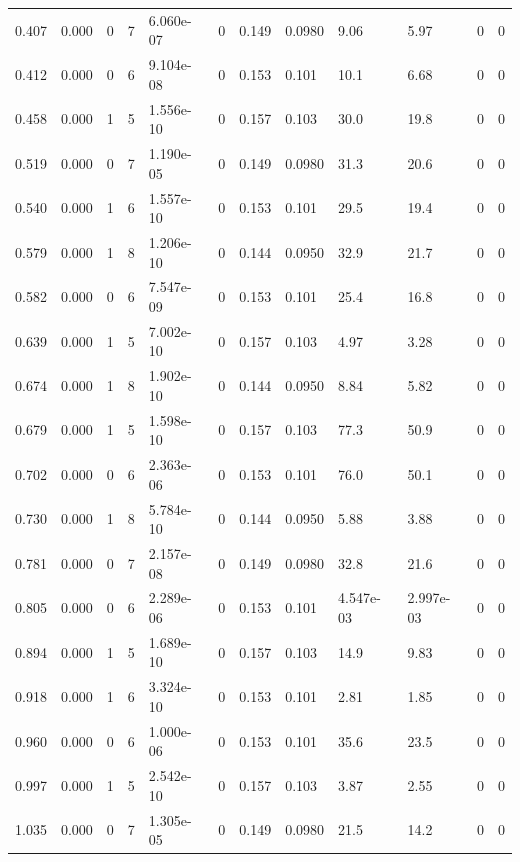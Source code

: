\documentclass[preview]{standalone}
\begin{document}
{{\begin{tabular}{L{1.2cm}C{1.2cm} C{0.3cm}C{0.5cm} C{1.4cm}C{1.4cm} C{1.4cm}C{1.4cm} C{1.6cm}C{1.6cm} C{1.6cm}C{1.6cm}}
  0.407  &  0.000  & 0     &  7 &  6.060e-07  & 0  &  0.149&   0.0980& 9.06 & 5.97   &  0 & 0  \\ 
  0.412  &  0.000  & 0     &  6 &  9.104e-08  & 0  &  0.153&   0.101& 10.1 & 6.68   &  0 & 0  \\ 
  0.458  &  0.000  & 1     &  5 &  1.556e-10  & 0  &  0.157&   0.103& 30.0 & 19.8   &  0 & 0  \\ 
  0.519  &  0.000  & 0     &  7 &  1.190e-05  & 0  &  0.149&   0.0980& 31.3 & 20.6   &  0 & 0  \\ 
  0.540  &  0.000  & 1     &  6 &  1.557e-10  & 0  &  0.153&   0.101& 29.5 & 19.4   &  0 & 0  \\ 
  0.579  &  0.000  & 1     &  8 &  1.206e-10  & 0  &  0.144&   0.0950& 32.9 & 21.7   &  0 & 0  \\ 
  0.582  &  0.000  & 0     &  6 &  7.547e-09  & 0  &  0.153&   0.101& 25.4 & 16.8   &  0 & 0  \\ 
  0.639  &  0.000  & 1     &  5 &  7.002e-10  & 0  &  0.157&   0.103& 4.97 & 3.28   &  0 & 0  \\ 
  0.674  &  0.000  & 1     &  8 &  1.902e-10  & 0  &  0.144&   0.0950& 8.84 & 5.82   &  0 & 0  \\ 
  0.679  &  0.000  & 1     &  5 &  1.598e-10  & 0  &  0.157&   0.103& 77.3 & 50.9   &  0 & 0  \\ 
  0.702  &  0.000  & 0     &  6 &  2.363e-06  & 0  &  0.153&   0.101& 76.0 & 50.1   &  0 & 0  \\ 
  0.730  &  0.000  & 1     &  8 &  5.784e-10  & 0  &  0.144&   0.0950& 5.88 & 3.88   &  0 & 0  \\ 
  0.781  &  0.000  & 0     &  7 &  2.157e-08  & 0  &  0.149&   0.0980& 32.8 & 21.6   &  0 & 0  \\ 
  0.805  &  0.000  & 0     &  6 &  2.289e-06  & 0  &  0.153&   0.101& 4.547e-03 & 2.997e-03   &  0 & 0  \\ 
  0.894  &  0.000  & 1     &  5 &  1.689e-10  & 0  &  0.157&   0.103& 14.9 & 9.83   &  0 & 0  \\ 
  0.918  &  0.000  & 1     &  6 &  3.324e-10  & 0  &  0.153&   0.101& 2.81 & 1.85   &  0 & 0  \\ 
  0.960  &  0.000  & 0     &  6 &  1.000e-06  & 0  &  0.153&   0.101& 35.6 & 23.5   &  0 & 0  \\ 
  0.997  &  0.000  & 1     &  5 &  2.542e-10  & 0  &  0.157&   0.103& 3.87 & 2.55   &  0 & 0  \\ 
  1.035  &  0.000  & 0     &  7 &  1.305e-05  & 0  &  0.149&   0.0980& 21.5 & 14.2   &  0 & 0  \\ 

\end{tabular}}}
\end{document}
